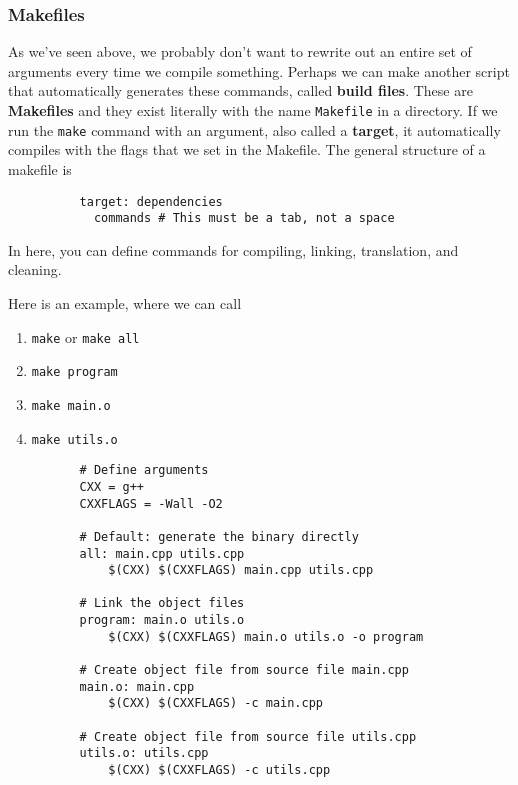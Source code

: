\documentclass{article}
\begin{document}
    \subsubsection{Makefiles} 
    
      \begin{definition}[Makefiles]
        As we've seen above, we probably don't want to rewrite out an entire set of arguments every time we compile something. Perhaps we can make another script that automatically generates these commands, called \textbf{build files}. These are \textbf{Makefiles} and they exist literally with the name \texttt{Makefile} in a directory. If we run the \texttt{make} command with an argument, also called a \textbf{target}, it automatically compiles with the flags that we set in the Makefile. The general structure of a makefile is 
        \begin{lstlisting}
          target: dependencies 
            commands # This must be a tab, not a space
        \end{lstlisting}
        In here, you can define commands for compiling, linking, translation, and cleaning.  
      \end{definition}

      \begin{example}
        Here is an example, where we can call 
        \begin{enumerate}
          \item \texttt{make} or \texttt{make all} 
          \item \texttt{make program}
          \item \texttt{make main.o} 
          \item \texttt{make utils.o}
        \end{enumerate}
        \begin{lstlisting}
          # Define arguments 
          CXX = g++
          CXXFLAGS = -Wall -O2

          # Default: generate the binary directly
          all: main.cpp utils.cpp 
              $(CXX) $(CXXFLAGS) main.cpp utils.cpp

          # Link the object files
          program: main.o utils.o
              $(CXX) $(CXXFLAGS) main.o utils.o -o program

          # Create object file from source file main.cpp
          main.o: main.cpp
              $(CXX) $(CXXFLAGS) -c main.cpp

          # Create object file from source file utils.cpp
          utils.o: utils.cpp
              $(CXX) $(CXXFLAGS) -c utils.cpp        
        \end{lstlisting}
      \end{example}
\end{document}

